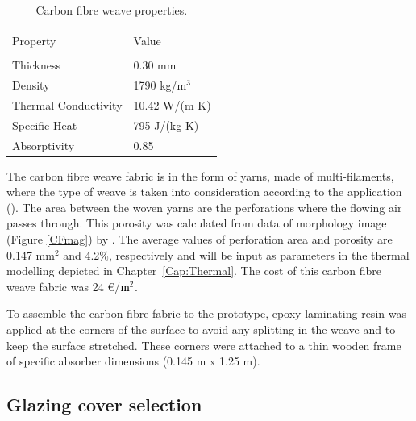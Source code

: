 \begin{table}[!ht]
	\caption{Carbon fibre weave properties.}
	\centering
	\begin{tabular}{p{5cm}p{4cm}}
		\hline \\[-12pt] 
		Property & Value \\ 
		\hline \\[-12pt] 
		Thickness & 0.30 mm \\ [3pt]
		Density & 1790 kg/m$^3$ \\ [3pt]
		Thermal Conductivity & 10.42 W/(m K) \\ [3pt]
		Specific Heat & 795 J/(kg K) \\ [3pt]
		Absorptivity & 0.85 \\ [1pt]
		\hline 
	\end{tabular} 
	\label{carbonfiber}
\end{table}

The carbon fibre weave fabric is in the form of yarns, made of multi-filaments, where the type of weave is taken into consideration according to the application (\cite{Tourlonias2016}). The area between the woven yarns are the perforations where the flowing air passes through. This porosity was calculated from data of morphology image (Figure \ref{CFmag}) by \citet{Shams2013}. The average values of perforation area and porosity are 0.147 mm$^2$ and 4.2\%, respectively and will be input as parameters in the thermal modelling depicted in \mbox{Chapter \ref{Cap:Thermal}}. The cost of this carbon fibre weave fabric was 24 \euro/${\rm m^2}$.


To assemble the carbon fibre fabric to the prototype, epoxy laminating resin was applied at the corners of the surface to avoid any splitting in the weave and to keep the surface stretched. These corners were attached to a thin wooden frame of specific absorber dimensions (0.145 m x 1.25 m).

\subsection{Glazing cover selection}

